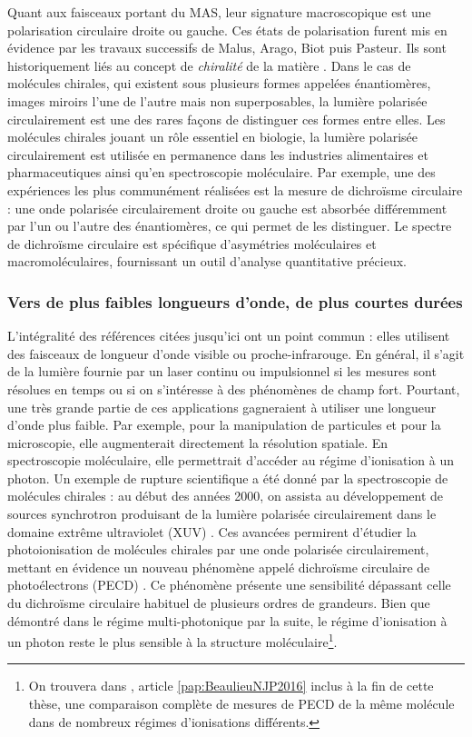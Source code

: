 Quant aux faisceaux portant du MAS, leur signature macroscopique est une polarisation circulaire droite ou gauche. Ces états de polarisation furent mis en évidence par les travaux successifs de Malus, Arago, Biot puis Pasteur. Ils sont historiquement liés au concept de \textit{chiralité} de la matière . Dans le cas de molécules chirales, qui existent sous plusieurs formes appelées énantiomères, images miroirs l'une de l'autre mais non superposables, la lumière polarisée circulairement est une des rares façons de distinguer ces formes entre elles. Les molécules chirales jouant un rôle essentiel en biologie, la lumière polarisée circulairement est utilisée en permanence dans les industries alimentaires et pharmaceutiques ainsi qu'en spectroscopie moléculaire. Par exemple, une des expériences les plus communément réalisées est la mesure de dichroïsme circulaire : une onde polarisée circulairement droite ou gauche est absorbée différemment par l'un ou l'autre des énantiomères, ce qui permet de les distinguer. Le spectre de dichroïsme circulaire est spécifique d’asymétries moléculaires et macromoléculaires, fournissant un outil d'analyse quantitative précieux.

\subsubsection{Vers de plus faibles longueurs d'onde, de plus courtes durées}
L'intégralité des références citées jusqu'ici ont un point commun : elles utilisent des faisceaux de longueur d'onde visible ou proche-infrarouge. En général, il s'agit de la lumière fournie par un laser continu ou impulsionnel si les mesures sont résolues en temps ou si on s'intéresse à des phénomènes de champ fort. Pourtant, une très grande partie de ces applications gagneraient à utiliser une longueur d'onde plus faible. Par exemple, pour la manipulation de particules et pour la microscopie, elle augmenterait directement la résolution spatiale. En spectroscopie moléculaire, elle permettrait d'accéder au régime d'ionisation à un photon. Un exemple de rupture scientifique a été donné par la spectroscopie de molécules chirales : au début des années 2000, on assista au développement de sources synchrotron produisant de la lumière polarisée circulairement dans le domaine extrême ultraviolet (XUV) . Ces avancées permirent d'étudier la photoionisation de molécules chirales par une onde polarisée circulairement, mettant en évidence un nouveau phénomène appelé dichroïsme circulaire de photoélectrons (PECD) . Ce phénomène présente une sensibilité dépassant celle du dichroïsme circulaire habituel de plusieurs ordres de grandeurs. Bien que démontré dans le régime multi-photonique par la suite, le régime d'ionisation à un photon reste le plus sensible à la structure moléculaire\footnote{On trouvera dans , article \ref{pap:BeaulieuNJP2016} inclus à la fin de cette thèse, une comparaison complète de mesures de PECD de la même molécule dans de nombreux régimes d'ionisations différents.}.

